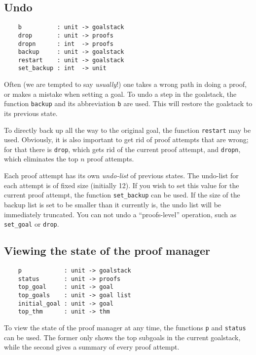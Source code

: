 \documentclass[12pt,fleqn,a4paper]{report}
\begin{document}
\subsection{Undo}

\begin{verbatim}
    b          : unit -> goalstack
    drop       : unit -> proofs
    dropn      : int  -> proofs
    backup     : unit -> goalstack
    restart    : unit -> goalstack
    set_backup : int  -> unit
\end{verbatim}

Often (we are tempted to say {\it usually}!) one takes a wrong path
in doing a proof, or makes a mistake when setting a goal. To undo a step
in the goalstack, the function \verb+backup+ and its abbreviation
\verb+b+ are used. This will restore the goalstack to its previous
state.


To directly back up all the way to the original goal, the function
\verb+restart+ may be used. Obviously, it is also important to get
rid of proof attempts that are wrong; for that there is \verb+drop+,
which gets rid of the current proof attempt, and \verb+dropn+, which
eliminates the top $n$ proof attempts.


Each proof attempt has its own {\it undo-list\/} of previous
states. The undo-list for each attempt is of fixed size (initially
12). If you wish to set this value for the current proof attempt, the
function \verb+set_backup+ can be used. If the size of the backup
list is set to be smaller than it currently is, the undo list will be
immediately truncated. You can not undo a ``proofs-level'' operation, such
as \verb+set_goal+ or \verb+drop+.

\subsection{Viewing the state of the proof manager}

\begin{verbatim}
    p            : unit -> goalstack
    status       : unit -> proofs
    top_goal     : unit -> goal
    top_goals    : unit -> goal list
    initial_goal : unit -> goal
    top_thm      : unit -> thm
\end{verbatim}

To view the state of the proof manager at any time, the functions
\verb+p+ and \verb+status+ can be used. The former only shows
the top subgoals in the current goalstack, while the second gives a
summary of every proof attempt.
\end{document}
